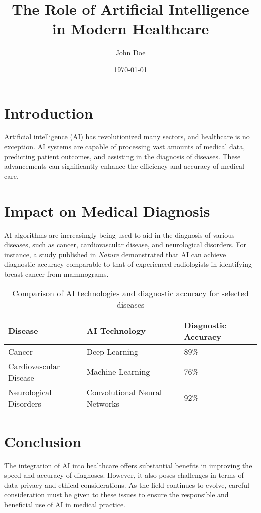 \documentclass[12pt]{article}
\title{The Role of Artificial Intelligence in Modern Healthcare}
\author{John Doe}
\date{\today}
\begin{document}
\maketitle

\section{Introduction}
Artificial intelligence (AI) has revolutionized many sectors, and healthcare is no exception. AI systems are capable of processing vast amounts of medical data, predicting patient outcomes, and assisting in the diagnosis of diseases. These advancements can significantly enhance the efficiency and accuracy of medical care.

\section{Impact on Medical Diagnosis}
AI algorithms are increasingly being used to aid in the diagnosis of various diseases, such as cancer, cardiovascular disease, and neurological disorders. For instance, a study published in \textit{Nature} demonstrated that AI can achieve diagnostic accuracy comparable to that of experienced radiologists in identifying breast cancer from mammograms. 

\begin{table}[h!]
\centering
\begin{tabular}{|l|l|l|}
\hline
\textbf{Disease} & \textbf{AI Technology} & \textbf{Diagnostic Accuracy} \\ \hline
Cancer & Deep Learning & 89\% \\ \hline
Cardiovascular Disease & Machine Learning & 76\% \\ \hline
Neurological Disorders & Convolutional Neural Networks & 92\% \\ \hline
\end{tabular}
\caption{Comparison of AI technologies and diagnostic accuracy for selected diseases}
\end{table}

\section{Conclusion}
The integration of AI into healthcare offers substantial benefits in improving the speed and accuracy of diagnoses. However, it also poses challenges in terms of data privacy and ethical considerations. As the field continues to evolve, careful consideration must be given to these issues to ensure the responsible and beneficial use of AI in medical practice.



\end{document}
